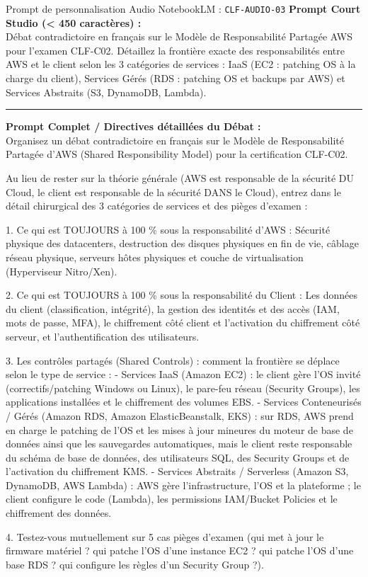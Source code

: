 \documentclass[11pt,a4paper]{article}
\begin{document}
\begin{promptbox}{Prompt de personnalisation Audio NotebookLM : \texttt{CLF-AUDIO-03}}
\textbf{Prompt Court Studio (< 450 caractères) :}\\
Débat contradictoire en français sur le Modèle de Responsabilité Partagée AWS pour l'examen CLF-C02. Détaillez la frontière exacte des responsabilités entre AWS et le client selon les 3 catégories de services : IaaS (EC2 : patching OS à la charge du client), Services Gérés (RDS : patching OS et backups par AWS) et Services Abstraits (S3, DynamoDB, Lambda).

\medskip\hrule\medskip
\textbf{Prompt Complet / Directives détaillées du Débat :}\\
Organisez un débat contradictoire en français sur le Modèle de Responsabilité Partagée d'AWS (Shared Responsibility Model) pour la certification CLF-C02.

Au lieu de rester sur la théorie générale (AWS est responsable de la sécurité DU Cloud, le client est responsable de la sécurité DANS le Cloud), entrez dans le détail chirurgical des 3 catégories de services et des pièges d'examen :

1. Ce qui est TOUJOURS à 100 \% sous la responsabilité d'AWS :
Sécurité physique des datacenters, destruction des disques physiques en fin de vie, câblage réseau physique, serveurs hôtes physiques et couche de virtualisation (Hyperviseur Nitro/Xen).

2. Ce qui est TOUJOURS à 100 \% sous la responsabilité du Client :
Les données du client (classification, intégrité), la gestion des identités et des accès (IAM, mots de passe, MFA), le chiffrement côté client et l'activation du chiffrement côté serveur, et l'authentification des utilisateurs.

3. Les contrôles partagés (Shared Controls) : comment la frontière se déplace selon le type de service :
- Services IaaS (Amazon EC2) : le client gère l'OS invité (correctifs/patching Windows ou Linux), le pare-feu réseau (Security Groups), les applications installées et le chiffrement des volumes EBS.
- Services Conteneurisés / Gérés (Amazon RDS, Amazon ElasticBeanstalk, EKS) : sur RDS, AWS prend en charge le patching de l'OS et les mises à jour mineures du moteur de base de données ainsi que les sauvegardes automatiques, mais le client reste responsable du schéma de base de données, des utilisateurs SQL, des Security Groups et de l'activation du chiffrement KMS.
- Services Abstraits / Serverless (Amazon S3, DynamoDB, AWS Lambda) : AWS gère l'infrastructure, l'OS et la plateforme ; le client configure le code (Lambda), les permissions IAM/Bucket Policies et le chiffrement des données.

4. Testez-vous mutuellement sur 5 cas pièges d'examen (qui met à jour le firmware matériel ? qui patche l'OS d'une instance EC2 ? qui patche l'OS d'une base RDS ? qui configure les règles d'un Security Group ?).
\end{promptbox}
\end{document}

